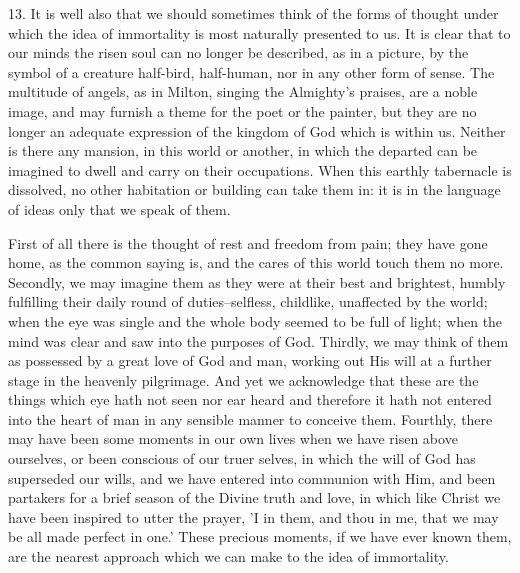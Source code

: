 13. It is well also that we should sometimes think of the forms of
thought under which the idea of immortality is most naturally presented
to us. It is clear that to our minds the risen soul can no longer be
described, as in a picture, by the symbol of a creature half-bird,
half-human, nor in any other form of sense. The multitude of angels, as
in Milton, singing the Almighty's praises, are a noble image, and may
furnish a theme for the poet or the painter, but they are no longer an
adequate expression of the kingdom of God which is within us. Neither is
there any mansion, in this world or another, in which the departed can
be imagined to dwell and carry on their occupations. When this earthly
tabernacle is dissolved, no other habitation or building can take them
in: it is in the language of ideas only that we speak of them.

First of all there is the thought of rest and freedom from pain; they
have gone home, as the common saying is, and the cares of this world
touch them no more. Secondly, we may imagine them as they were at
their best and brightest, humbly fulfilling their daily round of
duties--selfless, childlike, unaffected by the world; when the eye was
single and the whole body seemed to be full of light; when the mind was
clear and saw into the purposes of God. Thirdly, we may think of them
as possessed by a great love of God and man, working out His will at a
further stage in the heavenly pilgrimage. And yet we acknowledge that
these are the things which eye hath not seen nor ear heard and therefore
it hath not entered into the heart of man in any sensible manner to
conceive them. Fourthly, there may have been some moments in our own
lives when we have risen above ourselves, or been conscious of our truer
selves, in which the will of God has superseded our wills, and we have
entered into communion with Him, and been partakers for a brief season
of the Divine truth and love, in which like Christ we have been inspired
to utter the prayer, 'I in them, and thou in me, that we may be all made
perfect in one.' These precious moments, if we have ever known them, are
the nearest approach which we can make to the idea of immortality.

